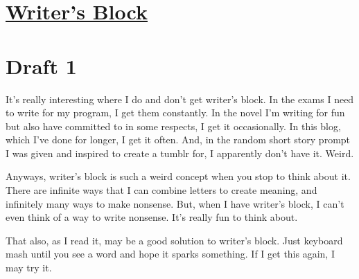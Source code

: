 \documentclass[12pt]{article}[titlepage]
\newcommand{\1}{\={a}}
\newcommand{\2}{\={e}}
\newcommand{\3}{\={\i}}
\newcommand{\4}{\=o}
\newcommand{\5}{\=u}
\newcommand{\6}{\={A}}
\renewcommand{\,}{\textsuperscript{,}}
\begin{document}
\doublespacing
\section{\href{writers-block-4.html}{Writer's Block}}
\section{Draft 1}
It's really interesting where I do and don't get writer's block.
In the exams I need to write for my program, I get them constantly.
In the novel I'm writing for fun but also have committed to in some respects, I get it occasionally.
In this blog, which I've done for longer, I get it often.
And, in the random short story prompt I was given and inspired to create a tumblr for, I apparently don't have it.
Weird.

Anyways, writer's block is such a weird concept when you stop to think about it.
There are infinite ways that I can combine letters to create meaning, and infinitely many ways to make nonsense.
But, when I have writer's block, I can't even think of a way to write nonsense.
It's really fun to think about.

That also, as I read it, may be a good solution to writer's block.
Just keyboard mash until you see a word and hope it sparks something.
If I get this again, I may try it.
\end{document}
